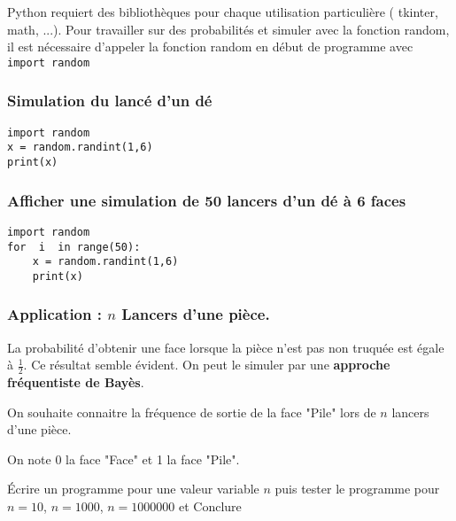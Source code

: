 
Python requiert des bibliothèques pour chaque utilisation particulière ( tkinter, math, ...). Pour travailler sur des probabilités et simuler avec la fonction random, il est nécessaire d'appeler la fonction random en début de programme avec \texttt{\color{orange}import \color{black} random}


\begin{minipage}{0.48\linewidth}

\subsubsection*{Simulation du lancé d'un dé}
\begin{lstlisting}
import random
x = random.randint(1,6)
print(x)
\end{lstlisting}
\end{minipage}
\hfill
\begin{minipage}{0.48\linewidth}
\subsubsection*{Afficher une simulation de 50 lancers d'un dé à 6 faces}

\begin{lstlisting}
import random
for  i  in range(50):
	x = random.randint(1,6)
	print(x)
\end{lstlisting}
\end{minipage}

\subsubsection*{Application : $n$ Lancers d'une pièce.}

La probabilité d'obtenir une face lorsque la pièce n'est pas non truquée est égale à $\frac{1}{2}$. Ce résultat semble évident. On peut le simuler par une \textbf{approche fréquentiste de Bayès}.
 
On souhaite connaitre la fréquence de sortie de la face "Pile" lors de $n$ lancers d'une pièce. 

On note 0 la face "Face" et 1 la face "Pile".

Écrire un programme pour une valeur variable $n$ puis tester le programme pour $n=10$, $n=1000$, $n=1000000$ et Conclure
 

%
%
%
%
%
%
%
%
%
%
%
%
